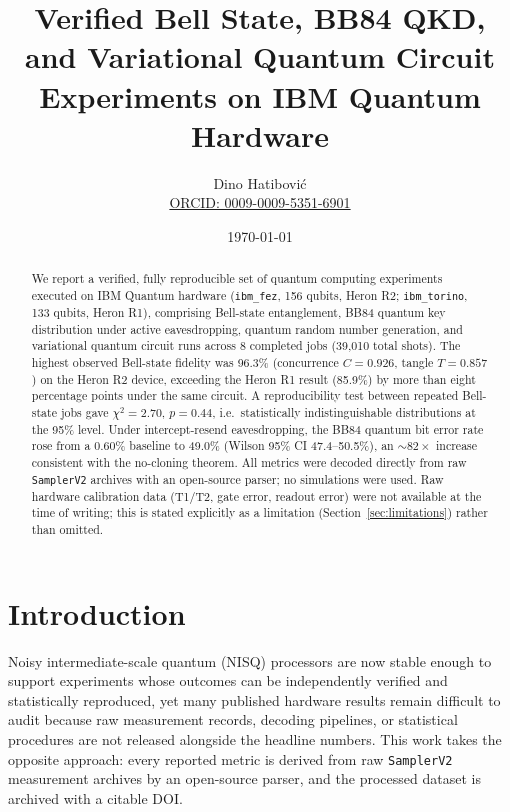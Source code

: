 \documentclass[11pt]{article}
\title{Verified Bell State, BB84 QKD, and Variational Quantum Circuit Experiments on IBM Quantum Hardware}
\author{Dino Hatibovi\'{c}\\
\href{https://orcid.org/0009-0009-5351-6901}{ORCID: 0009-0009-5351-6901}}
\date{\today}
\begin{document}
\maketitle

\begin{abstract}
We report a verified, fully reproducible set of quantum computing experiments
executed on IBM Quantum hardware (\texttt{ibm\_fez}, 156 qubits, Heron R2;
\texttt{ibm\_torino}, 133 qubits, Heron R1), comprising Bell-state
entanglement, BB84 quantum key distribution under active eavesdropping,
quantum random number generation, and variational quantum circuit runs across
8 completed jobs (39{,}010 total shots). The highest observed Bell-state
fidelity was 96.3\% (concurrence $C=0.926$, tangle $T=0.857$) on the Heron R2
device, exceeding the Heron R1 result (85.9\%) by more than eight percentage
points under the same circuit. A reproducibility test between repeated
Bell-state jobs gave $\chi^2=2.70$, $p=0.44$, i.e.\ statistically
indistinguishable distributions at the 95\% level. Under intercept-resend
eavesdropping, the BB84 quantum bit error rate rose from a 0.60\% baseline to
49.0\% (Wilson 95\% CI 47.4--50.5\%), an ${\sim}82\times$ increase consistent
with the no-cloning theorem. All metrics were decoded directly from raw
\texttt{SamplerV2} archives with an open-source parser; no simulations were
used. Raw hardware calibration data (T1/T2, gate error, readout error) were
not available at the time of writing; this is stated explicitly as a
limitation (Section~\ref{sec:limitations}) rather than omitted.
\end{abstract}

\section{Introduction}
Noisy intermediate-scale quantum (NISQ) processors are now stable enough to
support experiments whose outcomes can be independently verified and
statistically reproduced, yet many published hardware results remain
difficult to audit because raw measurement records, decoding pipelines, or
statistical procedures are not released alongside the headline numbers. This
work takes the opposite approach: every reported metric is derived from raw
\texttt{SamplerV2} measurement archives by an open-source parser, and the
processed dataset is archived with a citable DOI.
\end{document}
